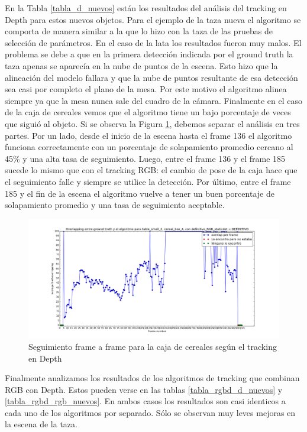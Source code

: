 En la Tabla \ref{tabla_d_nuevos} están los resultados del análisis del tracking en Depth para estos nuevos objetos. Para el ejemplo de la taza nueva el algoritmo se comporta de manera similar a la que lo hizo con la taza de las pruebas de selección de parámetros. En el caso de la lata los resultados fueron muy malos. El problema se debe a que en la primera detección indicada por el ground truth la taza apenas se aparecía en la nube de puntos de la escena. Esto hizo que la alineación del modelo fallara y que la nube de puntos resultante de esa detección sea casi por completo el plano de la mesa. Por este motivo el algoritmo alinea siempre ya que la mesa nunca sale del cuadro de la cámara.
Finalmente en el caso de la caja de cereales vemos que el algoritmo tiene un bajo porcentaje de veces que siguió al objeto. Si se observa la Figura \ref{frame_frame_d_nuevo}, debemos separar el análisis en tres partes. Por un lado, desde el inicio de la escena hasta el frame 136 el algoritmo funciona correctamente con un porcentaje de solapamiento promedio cercano al 45\% y una alta tasa de seguimiento. Luego, entre el frame 136 y el frame 185 sucede lo mismo que con el tracking RGB: el cambio de pose de la caja hace que el seguimiento falle y siempre se utilice la detección. Por último, entre el frame 185 y el fin de la escena el algoritmo vuelve a tener un buen porcentaje de solapamiento promedio y una tasa de seguimiento aceptable.

\begin{figure}
	\centering
	\includegraphics[width=\textwidth]{img/seguimientoframeaframe-depth-nuevo-caja.png}
	\caption{Seguimiento frame a frame para la caja de cereales según el tracking en Depth}
	\label{frame_frame_d_nuevo}
\end{figure}


Finalmente analizamos los resultados de los algoritmos de tracking que combinan RGB con Depth. Estos pueden verse en las tablas \ref{tabla_rgbd_d_nuevos} y \ref{tabla_rgbd_rgb_nuevos}. En ambos casos los resultados son casi identicos a cada uno de los algoritmos por separado. Sólo se observan muy leves mejoras en la escena de la taza. 

